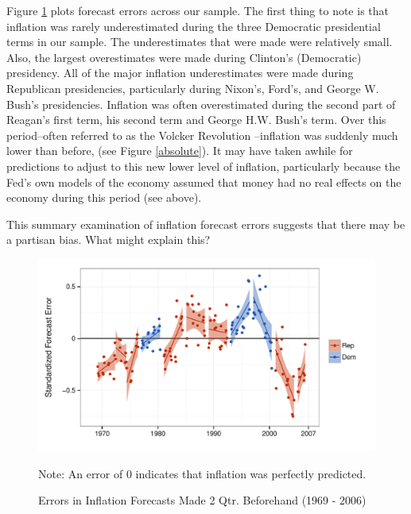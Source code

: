 \documentclass[a4paper]{article}\usepackage{graphicx, color}
\newenvironment{knitrout}{}{} %
\begin{document}
Figure \ref{errors_over_time} plots forecast errors across our sample. The first thing to note is that inflation was rarely underestimated during the three Democratic presidential terms in our sample. The underestimates that were made were relatively small. Also, the largest overestimates were made during Clinton's (Democratic) presidency. All of the major inflation underestimates were made during Republican presidencies, particularly during Nixon's, Ford's, and George W. Bush's presidencies. Inflation was often overestimated during the second part of Reagan's first term, his second term and George H.W. Bush's term. Over this period--often referred to as the Volcker Revolution \citep[see][]{Bartels1985}--inflation was suddenly much lower than before, (see Figure \ref{absolute}). It may have taken awhile for predictions to adjust to this new lower level of inflation, particularly because the Fed's own models of the economy assumed that money had no real effects on the economy during this period (see above).

This summary examination of inflation forecast errors suggests that there may be a partisan bias. What might explain this?

\begin{figure}[t]
    \caption{Errors in Inflation Forecasts Made 2 Qtr. Beforehand (1969 - 2006)}
    \label{errors_over_time}
    \begin{center}
    
\begin{knitrout}
\color{fgcolor}\includegraphics[width=0.8\linewidth]{figure/PartisanError} 
\end{knitrout}

    
    \end{center}
    \begin{singlespace}
        {\scriptsize{Note: An error of 0 indicates that inflation was perfectly predicted.}}
    \end{singlespace}
\end{figure}
\end{document}
